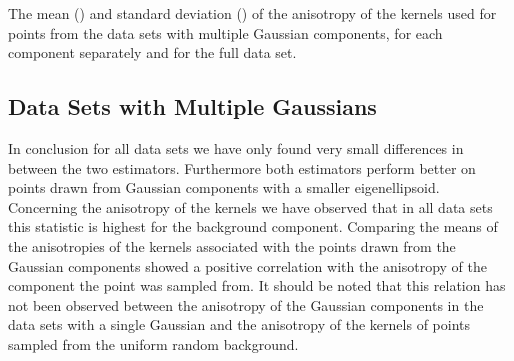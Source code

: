 	\begin{table*}
		\centering
		
		\caption{The mean (\mean) and standard deviation (\SD) of the anisotropy of the kernels used for points from the data sets with multiple Gaussian components, for each component separately and for the full data set.}
		\label{tab:results:multiSphere:anisotropy}
	\end{table*}

\subsection{Data Sets with Multiple Gaussians}
\label{s:results:multipleGaussian}


	In conclusion for all data sets we have only found very small differences in \mse between the two estimators.
	Furthermore both estimators perform better on points drawn from Gaussian components with a smaller eigenellipsoid.
	Concerning the anisotropy of the kernels we have observed that in all data sets this statistic is highest for the background component.
	Comparing the means of the anisotropies of the kernels associated with the points drawn from the Gaussian components showed a positive correlation with the anisotropy of the component the point was sampled from. It should be noted that this relation has not been observed between the anisotropy of the Gaussian components in the data sets with a single Gaussian and the anisotropy of the kernels of points sampled from the uniform random background.